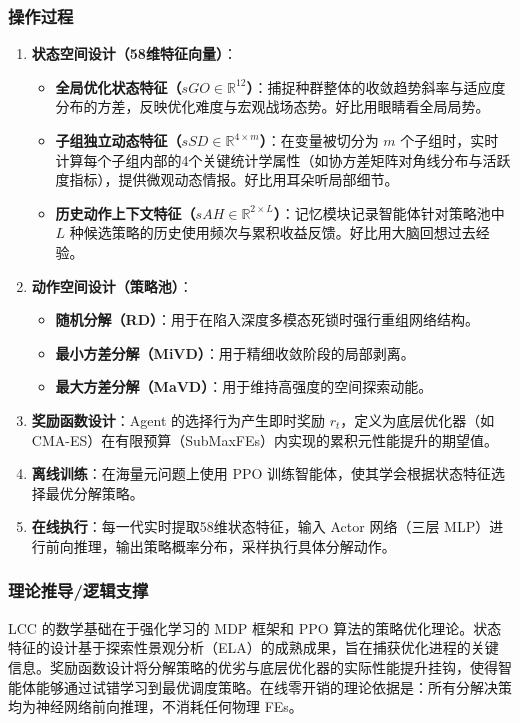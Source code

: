 \subsubsection*{操作过程}
\begin{enumerate}
    \item \textbf{状态空间设计（58维特征向量）}：
    \begin{itemize}
        \item \textbf{全局优化状态特征（$sGO \in \mathbb{R}^{12}$）}：捕捉种群整体的收敛趋势斜率与适应度分布的方差，反映优化难度与宏观战场态势。好比用眼睛看全局局势。
        \item \textbf{子组独立动态特征（$sSD \in \mathbb{R}^{4 \times m}$）}：在变量被切分为 $m$ 个子组时，实时计算每个子组内部的4个关键统计学属性（如协方差矩阵对角线分布与活跃度指标），提供微观动态情报。好比用耳朵听局部细节。
        \item \textbf{历史动作上下文特征（$sAH \in \mathbb{R}^{2 \times L}$）}：记忆模块记录智能体针对策略池中 $L$ 种候选策略的历史使用频次与累积收益反馈。好比用大脑回想过去经验。
    \end{itemize}
    \item \textbf{动作空间设计（策略池）}：
    \begin{itemize}
        \item \textbf{随机分解（RD）}：用于在陷入深度多模态死锁时强行重组网络结构。
        \item \textbf{最小方差分解（MiVD）}：用于精细收敛阶段的局部剥离。
        \item \textbf{最大方差分解（MaVD）}：用于维持高强度的空间探索动能。
    \end{itemize}
    \item \textbf{奖励函数设计}：Agent 的选择行为产生即时奖励 $r_t$，定义为底层优化器（如 CMA-ES）在有限预算（SubMaxFEs）内实现的累积元性能提升的期望值。
    \item \textbf{离线训练}：在海量元问题上使用 PPO 训练智能体，使其学会根据状态特征选择最优分解策略。
    \item \textbf{在线执行}：每一代实时提取58维状态特征，输入 Actor 网络（三层 MLP）进行前向推理，输出策略概率分布，采样执行具体分解动作。
\end{enumerate}

\subsubsection*{理论推导/逻辑支撑}
LCC 的数学基础在于强化学习的 MDP 框架和 PPO 算法的策略优化理论。状态特征的设计基于探索性景观分析（ELA）的成熟成果，旨在捕获优化进程的关键信息。奖励函数设计将分解策略的优劣与底层优化器的实际性能提升挂钩，使得智能体能够通过试错学习到最优调度策略。在线零开销的理论依据是：所有分解决策均为神经网络前向推理，不消耗任何物理 FEs。

